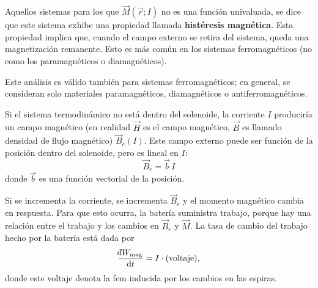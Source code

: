Aquellos sistemas para los que $\vec{M}(\vec{r};I)$ no es una función univaluada, se dice que este
sistema exhibe una propiedad llamada \textbf{histéresis magnética}. Esta propiedad implica que, cuando
el campo externo se retira del sistema, queda una magnetización remanente. Esto es más común en los
sistemas ferromagnéticos (no como los paramagnéticos o diamagnéticos).

Este análisis es válido también para sistemas ferromagnéticos; en general, se consideran solo
materiales paramagnéticos, diamagnéticos o antiferromagnéticos.

Si el sistema termodinámico no está dentro del solenoide, la corriente $I$ produciría un campo
magnético (en realidad $\vec{H}$ es el campo magnético, $\vec{B}$ es llamado densidad de flujo
magnético) $\vec{B}_e(I)$. Este campo externo puede ser función de la posición dentro del solenoide,
pero es lineal en $I$:
\begin{equation*}
  \boxed{\vec{B}_e=\vec{b}\,I}
\end{equation*}
donde $\vec{b}$ es una función vectorial de la posición.

Si se incrementa la corriente, se incrementa $\vec{B}_e$ y el momento magnético cambia en respuesta.
Para que esto ocurra, la batería suministra trabajo, porque hay una relación entre el trabajo y los
cambios en $\vec{B}_e$ y $\vec{M}$. La tasa de cambio del trabajo hecho por la batería está dada por
\begin{equation*}
  \frac{\dbar W_{\mathrm{mag}}}{\dd t}=I\cdot(\text{voltaje}),
\end{equation*}
donde este voltaje denota la fem inducida por los cambios en las espiras.

